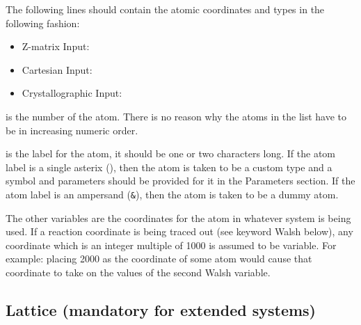 The following  lines should contain the atomic
coordinates and types in the following fashion:

\begin{itemize}

\item Z-matrix Input:    
     

\item Cartesian Input:   
 

\item Crystallographic Input:   
 

\end{itemize}

 is the number of the atom.  There is no reason why the
atoms in the list have to be in increasing numeric order.

 is the label for the atom, it should be one or two
characters long.  If the atom label is a single asterix ({\tt *}),
then the atom is taken to be a custom type and a symbol and
parameters should be provided for it in the {\sf Parameters} section.
If the atom label is an ampersand ({\tt \&}), then the atom is taken
to be a dummy atom.

The other variables are the coordinates for the atom in whatever
system is being used.  If a reaction coordinate is being traced out
(see keyword {\sf Walsh} below), any coordinate which is an integer
multiple of 1000 is assumed to be variable.  For example: placing 2000
as the  coordinate of some atom would cause that coordinate to
take on the values of the second Walsh variable.




\subsection{{\sf Lattice} (mandatory for extended systems)}


